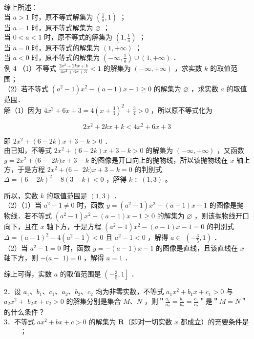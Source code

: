 \documentclass[10pt]{article}
\begin{document}
综上所述：\\
当 \(a>1\) 时，原不等式解集为 \(\left(\frac{1}{a}, 1\right)\) ；\\
当 \(a=1\) 时，原不等式解集为 \(\varnothing\) ；\\
当 \(0<a<1\) 时，原不等式的解集为 \(\left(1, \frac{1}{a}\right)\) ；\\
当 \(a=0\) 时，原不等式的解集为 \((1,+\infty)\) ；\\
当 \(a<0\) 时，原不等式的解集为 \(\left(-\infty, \frac{1}{a}\right) \cup(1,+\infty)\) ．\\
例 4 （1）不等式 \(\frac{2 x^{2}+2 k x+k}{4 x^{2}+6 x+3}<1\) 的解集为 \((-\infty,+\infty)\) ，求实数 \(k\) 的取值范围；\\
（2）若不等式 \(\left(a^{2}-1\right) x^{2}-(a-1) x-1 \geqslant 0\) 的解集为 \(\varnothing\) ，求实数 \(a\) 的取值范围．\\
解（1）因为 \(4 x^{2}+6 x+3=4\left(x+\frac{3}{4}\right)^{2}+\frac{3}{4}>0\) ，所以原不等式化为

\[
2 x^{2}+2 k x+k<4 x^{2}+6 x+3
\]

即 \(2 x^{2}+(6-2 k) x+3-k>0\) ．\\
由已知，不等式 \(2 x^{2}+(6-2 k) x+3-k>0\) 的解集为 \((-\infty,+\infty)\) ，又函数 \(y=2 x^{2}+(6-\) \(2 k) x+3-k\) 的图像是开口向上的抛物线，所以该抛物线在 \(x\) 轴上方，于是方程 \(2 x^{2}+(6-\) \(2 k) x+3-k=0\) 的判别式 \(\Delta=(6-2 k)^{2}-8(3-k)<0\) ，解得 \(k \in(1,3)\) 。

所以，实数 \(k\) 的取值范围是 \((1,3)\) ．\\
（2）（1）当 \(a^{2}-1 \neq 0\) 时，函数 \(y=\left(a^{2}-1\right) x^{2}-(a-1) x-1\) 的图像是抛物线．若不等式 \(\left(a^{2}-1\right) x^{2}-(a-1) x-1 \geqslant 0\) 的解集为 \(\varnothing\) ，则该抛物线开口向下，且在 \(x\) 轴下方，于是方程 \(\left(a^{2}-1\right) x^{2}-(a-1) x-1=0\) 的判别式 \(\Delta=(a-1)^{2}+4\left(a^{2}-1\right)<0\) 且 \(a^{2}-1<0\) ，解得 \(a \in\) \(\left(-\frac{3}{5}, 1\right)\) ．\\
（2）当 \(a^{2}-1=0\) 时，函数 \(y=-(a-1) x-1\) 的图像是直线，且该直线在 \(x\) 轴下方，则 \(-(a-\) \(1)=0\) ，解得 \(a=1\) ．

综上可得，实数 \(a\) 的取值范围是 \(\left(-\frac{3}{5}, 1\right]\) ．

2．设 \(a_{1} 、 b_{1} 、 c_{1} 、 a_{2} 、 b_{2} 、 c_{2}\) 均为非零实数，不等式 \(a_{1} x^{2}+b_{1} x+c_{1}>0\) 与 \(a_{2} x^{2}+\) \(b_{2} x+c_{2}>0\) 的解集分别是集合 \(M 、 N\) ，则＂\(\frac{a_{1}}{a_{2}}=\frac{b_{1}}{b_{2}}=\frac{c_{1}}{c_{2}}\)＂是＂\(M=N\)＂的什么条件？\\
3．不等式 \(a x^{2}+b x+c>0\) 的解集为 \(\mathbf{R}\)（即对一切实数 \(x\) 都成立）的充要条件是\\
\(\qquad\) ；
\end{document}

